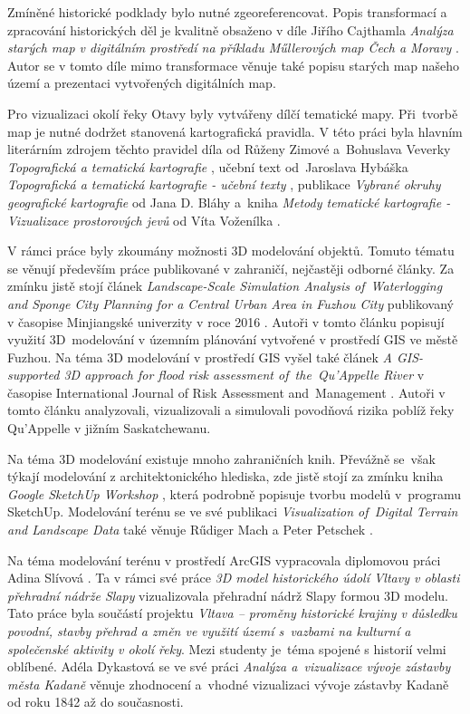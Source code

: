 \documentclass[thesis=M,czech]{FITthesis}[2012/06/26]
\begin{document}
Zmíněné historické podklady bylo nutné zgeoreferencovat. Popis transformací a zpracování historických děl je kvalitně obsaženo v díle Jiřího Cajthamla \textit{Analýza starých map v digitálním prostředí na příkladu Műllerových map Čech a Moravy} \cite{transformace}. Autor se v tomto díle mimo transformace věnuje také popisu starých map našeho území a prezentaci vytvořených digitálních map.

Pro vizualizaci okolí řeky Otavy byly vytvářeny dílčí tematické mapy. Při~tvorbě map je nutné dodržet stanovená kartografická pravidla. V této práci byla hlavním literárním zdrojem těchto pravidel díla od Růženy Zimové a~Bohuslava Veverky \textit{Topografická a tematická kartografie} \cite{topo_skripta}, učební text od~Jaroslava Hybáška \textit{Topografická a tematická kartografie - učební texty} \cite{tematicka_brno}, publikace \textit{Vybrané okruhy geografické kartografie} od Jana D. Bláhy \cite{kartoblaha} a~kniha \textit{Metody tematické kartografie - Vizualizace prostorových jevů} od Víta Voženílka \cite{mapyolomouc}.

V rámci práce byly zkoumány možnosti 3D modelování objektů. Tomuto tématu se věnují především práce publikované v zahraničí, nejčastěji odborné články. Za zmínku jistě stojí článek \textit{Landscape-Scale Simulation Analysis of~Waterlogging and Sponge City Planning for a Central Urban Area in Fuzhou City} publikovaný v časopise Minjiangské univerzity v roce 2016 \cite{cina}. Autoři v tomto článku popisují využití 3D~modelování v územním plánování vytvořené v prostředí GIS ve městě Fuzhou. Na téma 3D modelování v prostředí GIS vyšel také článek \textit{A GIS-supported 3D approach for flood risk assessment of~the~Qu'Appelle River} v časopise International Journal of Risk Assessment and~Management \cite{clanek_flood}. Autoři v tomto článku analyzovali, vizualizovali a simulovali povodňová rizika poblíž řeky Qu'Appelle v jižním Saskatchewanu. 

Na téma 3D modelování existuje mnoho zahraničních knih. Převážně se~však týkají modelování z architektonického hlediska, zde jistě stojí za zmínku kniha \textit{Google SketchUp Workshop} \cite{sketchup}, která podrobně popisuje tvorbu modelů v~programu SketchUp. Modelování terénu se ve své publikaci \textit{Visualization of~Digital Terrain and Landscape Data} také věnuje Rűdiger Mach a Peter Petschek \cite{vizteren}. 

Na téma modelování terénu v prostředí ArcGIS vypracovala diplomovou práci Adina Slívová \cite{adina}. Ta v rámci své práce \textit{3D model historického údolí Vltavy v oblasti přehradní nádrže Slapy} vizualizovala přehradní nádrž Slapy formou 3D modelu. Tato práce byla součástí projektu \textit{Vltava – proměny historické krajiny v důsledku povodní, stavby přehrad a změn ve využití území s~vazbami na kulturní a společenské aktivity v okolí řeky}. Mezi studenty je~téma spojené s historií velmi oblíbené. Adéla Dykastová se ve své práci \textit{Analýza a~vizualizace vývoje zástavby města Kadaně} \cite{dykastova} věnuje zhodnocení a~vhodné vizualizaci vývoje zástavby Kadaně od roku 1842 až do současnosti. 
\end{document}
